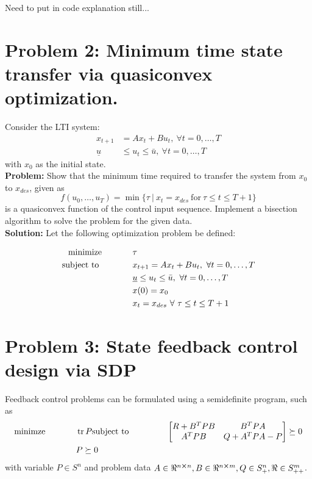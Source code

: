 \documentclass[letter]{article}
\newcommand{\optpblm}[3][eq:default]{
	\begin{equation}\label{#1}
		\begin{aligned}
			\text{minimize} \hspace{0.5in} &#2\vspace{5pt}\\
			\text{subject to \hspace{0.5in}} &#3
		\end{aligned}	
	\end{equation}
}
\begin{document}
{\Huge Need to put in code explanation still...}










\newpage
\section{Problem 2: Minimum time state transfer via quasiconvex optimization.}
Consider the LTI system:
\begin{equation}\label{eq:quasiconvex_opt_def}
	\begin{aligned}
		x_{t+1} &= Ax_t + B u_t, \ \forall t = 0,\dots,T\\
		\underline{u} &\leq u_t \leq \bar{u}, \ \forall t = 0,\dots,T
	\end{aligned}
\end{equation}
with $x_0$ as the initial state.\\

\textbf{Problem:}
Show that the minimum time required to transfer the system from $x_0$ to $x_{des}$, given as
\begin{equation}\label{eq:qualiconvex_problem_result}
	f(u_0,\dots,u_T) = \min \{\tau \ | \ x_t = x_{des} \ \text{for} \ \tau \leq t \leq {T+1}\}
\end{equation}
is a quasiconvex function of the control input sequence. Implement a bisection algorithm to solve the problem for the given data.\\

\textbf{Solution:}
Let the following optimization problem be defined:
\optpblm{\tau}{
	x_{t+1} = Ax_t + B u_t, \ \forall t = 0,\dots,T\\
	&\underline{u} \leq u_t \leq \bar{u}, \ \forall t = 0,\dots,T\\
	& x(0) = x_0\\
	& x_t = x_{des} \ \forall \ \tau \leq t \leq T+1
	}







\newpage
\section{Problem 3: State feedback control design via SDP}
Feedback control problems can be formulated using a semidefinite program, such as
\begin{equation}\label{eq:feedback_control_def}
	\begin{aligned}
		\text{minimze} \hspace{0.5in}& \trace{P}
		\text{subject to} \hspace{0.5in}
		& \mqty [R + B^T PB & B^T PA\\
				 A^T PB & Q + A^T P A - P] \succeq 0\\
				 & P \succeq 0
	\end{aligned}
\end{equation}
with variable $P \in S^n$ and problem data $A\in \real^{n\cross n}, B \in\real^{n\cross m}, Q \in S^n_+, \real \in S^m_{++}$.\\
\end{document}
